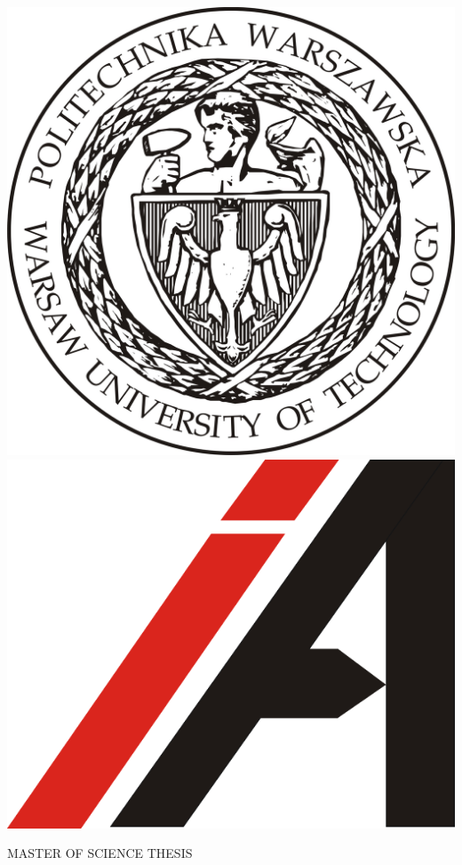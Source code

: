 \documentclass[12pt,a4paper,oneside]{article}
\begin{document}
\begin{titlepage}
	\includegraphics[scale=0.2]{Logo-PW-duze.jpg}
	\hspace{1cm}
	\includegraphics[scale=1]{ia_600_600.png}
	\par
	\vspace{2cm}
	MASTER OF SCIENCE THESIS\par

\end{titlepage}
\end{document}
